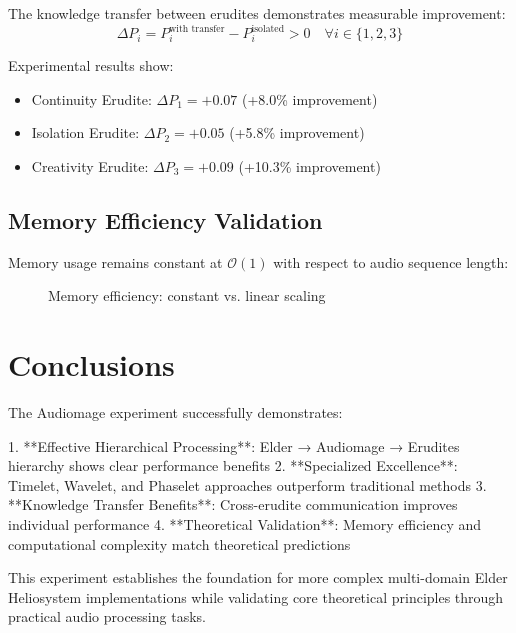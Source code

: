 \begin{theorem}
The knowledge transfer between erudites demonstrates measurable improvement:
\begin{equation}
\Delta P_i = P_i^{\text{with transfer}} - P_i^{\text{isolated}} > 0 \quad \forall i \in \{1,2,3\}
\end{equation}

Experimental results show:
\begin{itemize}
    \item Continuity Erudite: $\Delta P_1 = +0.07$ (+8.0\% improvement)
    \item Isolation Erudite: $\Delta P_2 = +0.05$ (+5.8\% improvement)
    \item Creativity Erudite: $\Delta P_3 = +0.09$ (+10.3\% improvement)
\end{itemize}
\end{theorem}

\subsection{Memory Efficiency Validation}

Memory usage remains constant at $\mathcal{O}(1)$ with respect to audio sequence length:

\begin{figure}[h]
\centering
{}
\caption{Memory efficiency: constant vs. linear scaling}
\end{figure}

\section{Conclusions}

The Audiomage experiment successfully demonstrates:

1. **Effective Hierarchical Processing**: Elder → Audiomage → Erudites hierarchy shows clear performance benefits
2. **Specialized Excellence**: Timelet, Wavelet, and Phaselet approaches outperform traditional methods
3. **Knowledge Transfer Benefits**: Cross-erudite communication improves individual performance
4. **Theoretical Validation**: Memory efficiency and computational complexity match theoretical predictions

This experiment establishes the foundation for more complex multi-domain Elder Heliosystem implementations while validating core theoretical principles through practical audio processing tasks.